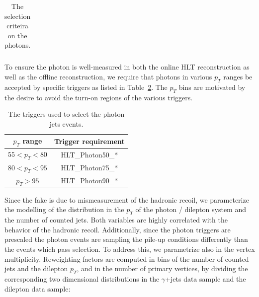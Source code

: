 \begin{table}[!ht]
\begin{center}
\begin{tabular}{|c|c|}
\end{tabular}
\caption{The selection criteira on the photons.
\label{tab:PhotonSelection}}
\end{center}
\end{table}

To ensure the photon is well-measured in both the online HLT reconstruction as well as the offline reconstruction, we require that photons in
various $p_T$ ranges be accepted by specific triggers as listed in Table~\ref{tab:PhotonTriggerPtBins}. The $p_T$ bins are motivated by the
desire to avoid the turn-on regions of the various triggers.
\begin{table}[!ht]
\begin{center}
\begin{tabular}{|c|c|} 
\hline
$p_T$ range     & Trigger requirement \\
\hline
$55 < p_T < 80$ & HLT\_Photon50\_* \\
$80 < p_T < 95$ & HLT\_Photon75\_* \\
$p_T > 95$      & HLT\_Photon90\_* \\
\hline
\end{tabular}
\caption{The triggers used to select the photon jets events.
\label{tab:PhotonTriggerPtBins}}
\end{center}
\end{table}

Since the fake \met is due to mismeasurement of the hadronic recoil, we parameterize the 
modelling of the \met distribution in the $p_{T}$ of the photon / dilepton system and 
the number of counted jets. Both variables are highly correlated with the behavior 
of the hadronic recoil. Additionally, since the photon triggers are prescaled
the photon events are sampling the pile-up conditions differently than the events which
pass selection. To address this, we parametrize also in the vertex multiplicity.
Reweighting factors are computed in bins of the number of counted jets
and the dilepton $p_{T}$, and in the number of primary vertices,
by dividing the corresponding two dimensional distributions
in the $\gamma$+jets data sample and the dilepton data sample:

